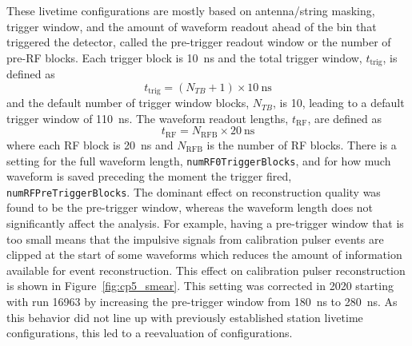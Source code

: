  These livetime configurations are mostly based on antenna/string masking, trigger window, and the amount of waveform readout ahead of the bin that triggered the detector, called the pre-trigger readout window or the number of pre-RF blocks. 
  Each trigger block is 10~ns and the total trigger window, $t_{\text{trig}}$, is defined as 
  \begin{equation}
    t_{\text{trig}} = (N_{TB}+1) \times 10~\text{ns}
    \label{eq:trigwin}
  \end{equation}
  and the default number of trigger window blocks, $N_{TB}$, is 10, leading to a default trigger window of 110~ns.
  The waveform readout lengths, $t_{\text{RF}}$, are defined as
  \begin{equation}
    t_{\text{RF}} = N_{\text{RFB}} \times 20~\text{ns}
    \label{eq:readoutwin}
  \end{equation}
  where each RF block is 20~ns and $N_{\text{RFB}}$ is the number of RF blocks.
  There is a setting for the full waveform length, \texttt{numRF0TriggerBlocks}, and for how much waveform is saved preceding the moment the trigger fired, \texttt{numRFPreTriggerBlocks}. 
  The dominant effect on reconstruction quality was found to be the pre-trigger window, whereas the waveform length does not significantly affect the analysis.
  For example, having a pre-trigger window that is too small means that the impulsive signals from calibration pulser events are clipped at the start of some waveforms which reduces the amount of information available for event reconstruction. 
  This effect on calibration pulser reconstruction is shown in Figure~\ref{fig:cp5_smear}.
  This setting was corrected in 2020 starting with run 16963 by increasing the pre-trigger window from 180~ns to 280~ns.
  As this behavior did not line up with previously established station livetime configurations, this led to a reevaluation of configurations.


